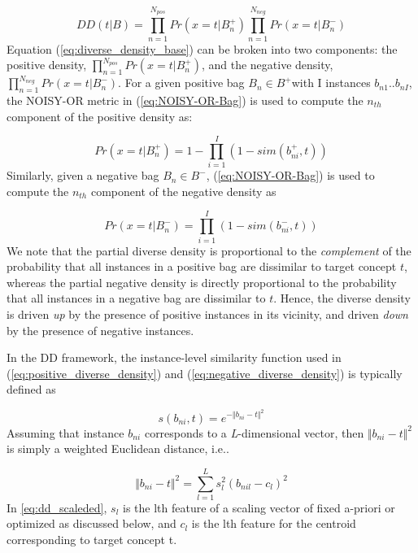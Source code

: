 \documentclass[12pt,dvips]{report}
\numberwithin{equation}{section}
\begin{document}
\begin{equation} 
DD(t\vert B)=\prod_{n=1}^{N_{pos}}Pr(x=t\vert B_{n}^{+})\prod_{n=1}^{N_{neg}}Pr(x=t\vert B_{n}^{-})\label{eq:diverse_density_base}
\end{equation} Equation (\ref{eq:diverse_density_base}) can be broken into two components: the positive density, $\prod_{n=1}^{N_{pos}}Pr(x=t\vert B_{n}^{+})$, and the negative density, $\prod_{n=1}^{N_{neg}}Pr(x=t\vert B_{n}^{-})$. For a given positive bag $B_{n}\in B^{+}$with I instances $b_{n1}..b_{nI}$, the NOISY-OR metric in (\ref{eq:NOISY-OR-Bag}) is used to compute the $n_{th}$ component of the positive density as:

\begin{equation}
Pr(x=t\vert B_{n}^{+})=1-\prod_{i=1}^{I}(1-sim(b_{ni}^{+},t))\label{eq:positive_diverse_density}
\end{equation}  Similarly, given a negative bag $B_{n}\in B^{-}$, (\ref{eq:NOISY-OR-Bag}) is used to compute the $n_{th}$ component of the negative density as 

\begin{equation}
Pr(x=t\vert B_{n}^{-})=\prod_{i=1}^{I}(1-sim(b_{ni}^{-},t))\label{eq:negative_diverse_density}
\end{equation}  We note that the partial diverse density is proportional to the \emph{complement} of the probability that all\emph{ }instances in a positive bag are dissimilar to target concept $t$, whereas the partial negative density is directly proportional to the probability that all\emph{ }instances in a negative bag are dissimilar to $t$. Hence, the diverse density is driven \emph{up} by the presence of positive instances in its vicinity, and driven \emph{down} by the presence of negative instances.

In the DD framework, the instance-level similarity function used in (\ref{eq:positive_diverse_density}) and (\ref{eq:negative_diverse_density}) is typically defined as  

\begin{equation} 
s(b_{ni},t)=e^{-\Vert b_{ni}-t\Vert^{2}}\label{eq:dd_similarity} 
\end{equation} Assuming that instance $b_{ni}$ corresponds to a \emph{L}-dimensional
vector, then $\Vert b_{ni}-t\Vert^{2}$ is simply a weighted Euclidean distance, i.e..

\begin{equation}
\Vert b_{ni}-t\Vert^{2}=\sum_{l=1}^{L}s_{l}^{2}(b_{nil}-c_{l})^{2}\label{eq:dd_scaleded}
\end{equation}  In \ref{eq:dd_scaleded}, $s_{l}$ is the lth feature of a  scaling vector of fixed a-priori or optimized as discussed below, and $c_{l}$ is the lth feature for the centroid corresponding to target concept t.
\end{document}
